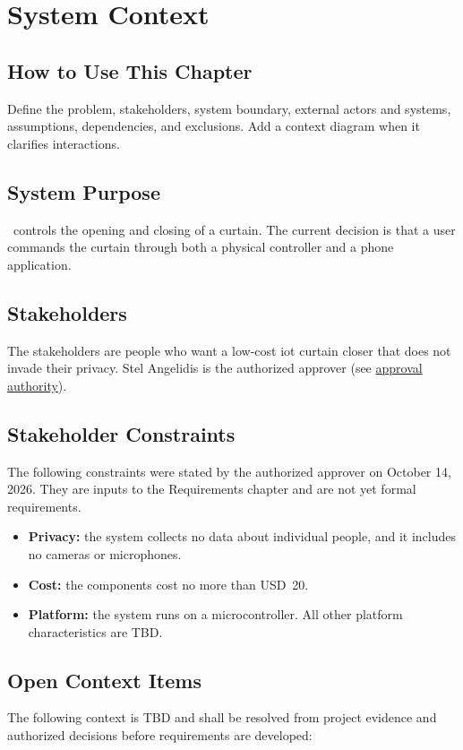 \chapter{System Context}
\section{How to Use This Chapter}
Define the problem, stakeholders, system boundary, external actors and systems, assumptions, dependencies, and exclusions. Add a context diagram when it clarifies interactions.
\section{System Purpose}
\label{Section:SystemPurpose}
\ProjectName\ controls the opening and closing of a curtain. The current
decision is that a user commands the curtain through both a physical
controller and a phone application.

\section{Stakeholders}
\label{Section:Stakeholders}
The stakeholders are people who want a low-cost \gls{iot} curtain closer that
does not invade their privacy. Stel Angelidis is the authorized approver (see
\hyperref[Section:DevelopmentPlanRoles]{approval authority}).

\section{Stakeholder Constraints}
\label{Section:StakeholderConstraints}
The following constraints were stated by the authorized approver on
October 14, 2026. They are inputs to the Requirements chapter and are not yet
formal requirements.

\begin{itemize}
\item \textbf{Privacy:} the system collects no data about individual
people, and it includes no cameras or microphones.
\item \textbf{Cost:} the components cost no more than USD~20.
\item \textbf{Platform:} the system runs on a microcontroller. All other
platform characteristics are TBD.
\end{itemize}

\section{Open Context Items}
\label{Section:OpenContextItems}
The following context is TBD and shall be resolved from project evidence and
authorized decisions before requirements are developed:

